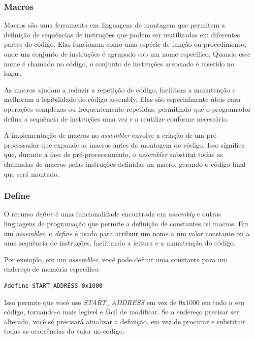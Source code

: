 \documentclass[
	12pt,				%
	openright,			%
	oneside,			%
	a4paper,			%
	english,			%
	french,				%
	spanish,			%
	brazil,				%
	]{abntex2}
\begin{document}
\subsubsection{Macros}\label{recursos_macro}
Macros são uma ferramenta em linguagens de montagem que permitem a definição de sequências de instruções que podem ser reutilizadas em diferentes partes do código. Elas funcionam como uma espécie de função ou procedimento, onde um conjunto de instruções é agrupado sob um nome específico. Quando esse nome é chamado no código, o conjunto de instruções associado é inserido no lugar.

As macros ajudam a reduzir a repetição de código, facilitam a manutenção e melhoram a legibilidade do código assembly. Elas são especialmente úteis para operações complexas ou frequentemente repetidas, permitindo que o programador defina a sequência de instruções uma vez e a reutilize conforme necessário.

A implementação de macros no \textit{assembler} envolve a criação de um pré-processador que expande as macros antes da montagem do código. Isso significa que, durante a fase de pré-processamento, o \textit{assembler} substitui todas as chamadas de macros pelas instruções definidas na macro, gerando o código final que será montado.

\subsubsection{Define}\label{recursos_define}

O recurso \textit{define} é uma funcionalidade encontrada em \textit{assembly} e outras linguagens de programação que permite a definição de constantes ou macros. Em um \textit{assembler}, o \textit{define} é usado para atribuir um nome a um valor constante ou a uma sequência de instruções, facilitando a leitura e a manutenção do código.

Por exemplo, em um \textit{assembler}, você pode definir uma constante para um endereço de memória específico:

\begin{lstlisting}
#define START_ADDRESS 0x1000
\end{lstlisting}

Isso permite que você use \textit{START\_ADDRESS} em vez de 0x1000 em todo o seu código, tornando-o mais legível e fácil de modificar. Se o endereço precisar ser alterado, você só precisará atualizar a definição, em vez de procurar e substituir todas as ocorrências do valor no código.
\end{document}
